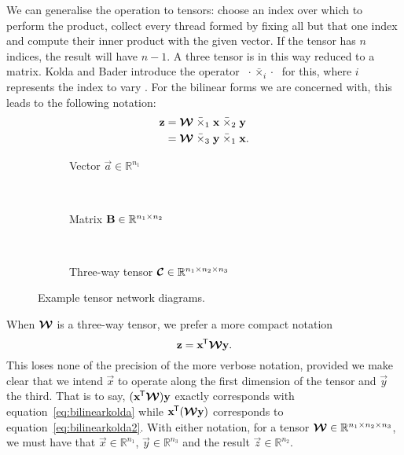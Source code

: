 We can generalise the operation to tensors: choose an index over which to perform the product,
collect every thread formed by fixing all but that one index and compute their inner product with the
given vector. If the tensor has \(n\) indices, the result will have \(n-1\). A three tensor is in
this way reduced to a matrix. Kolda and Bader introduce the operator
 \(\;\cdot \bar{\times}_i \cdot\;\)
for this, where \(i\) represents the index to vary \autocite{Kolda2009}. For the bilinear forms
we are concerned with, this leads to the following notation:
\begin{align}
	\mathbf{z} &= \bm{\mathcal{W}} \;\bar{\times}_1\; \mathbf{x}\; \bar{\times}_2\; \mathbf{y} 
	\label{eq:bilinearkolda} \\
	&= \bm{\mathcal{W}} \; \bar{\times}_3\; \mathbf{y}\; \bar{\times}_1\; \mathbf{x}.
	\label{eq:bilinearkolda2}
\end{align}

\begin{figure}
	\centering
	\begin{subfigure}[t]{0.45\textwidth}
	\centering
	\caption{Vector \(\vec{a}\in\mathbb{R}^{n_1}\)}\label{fig:tnd:vec}
	\end{subfigure} ~
	\begin{subfigure}[t]{0.45\textwidth}
	\centering
	\caption{Matrix \(\mathbf{B}\in\mathbb{R}^{n_1 \times n_2}\)}\label{fig:tnd:mat}
	\end{subfigure} \\
	
	\begin{subfigure}[t]{0.5\textwidth}
	\centering
	\caption{Three-way tensor 
		\(\bm{\mathcal{C}}\in\mathbb{R}^{n_1\times n_2\times n_3}\)}\label{fig:tnd:3ten}
	\end{subfigure}
	\caption{Example tensor network diagrams.}
	\label{fig:tnegs}
\end{figure}

When \(\bm{\mathcal{W}}\) is a three-way tensor, we prefer a more compact notation
\begin{equation}\label{eq:bilintensor}
	\mathbf{z} = \mathbf{x}^{\mkern-1.5mu\mathsf{T}}\bm{\mathcal{W}}\mathbf{y}.
\end{equation} This loses none of the precision of the more verbose notation, provided we make clear
that we intend \(\vec{x}\) to operate along the first dimension of the tensor and \(\vec{y}\) the
third. That is to say, \((\mathbf{x}^{\mkern-1.5mu\mathsf{T}}\bm{\mathcal{W}})\mathbf{y}\) exactly corresponds with 
equation~\eqref{eq:bilinearkolda} while \(\mathbf{x}^{\mkern-1.5mu\mathsf{T}}(\bm{\mathcal{W}}\mathbf{y})\) corresponds to
equation~\eqref{eq:bilinearkolda2}. With either notation, for a tensor 
\(\bm{\mathcal{W}} \in \mathbb{R}^{n_1 \times n_2 \times n_3}\), we must have that 
\(\vec{x}\in \mathbb{R}^{n_1}\), \(\vec{y} \in \mathbb{R}^{n_3}\) and the result 
\(\vec{z}\in\mathbb{R}^{n_2}\).


